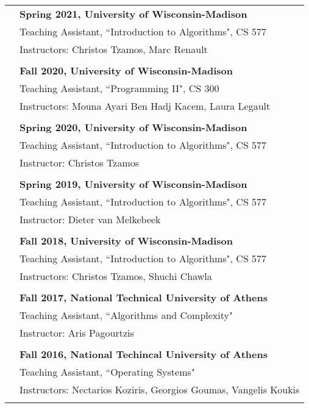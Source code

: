 \documentclass[letterpaper,11pt,oneside]{article}
\begin{document}
\begin{longtable}{@{} l l}
  & \textbf{Spring 2021, University of Wisconsin-Madison} \\
  & Teaching Assistant, ``Introduction to Algorithms", CS 577 \\
  & Instructors: Christos Tzamos, Marc Renault \\
  & \\

  & \textbf{Fall 2020, University of Wisconsin-Madison} \\
  & Teaching Assistant, ``Programming II", CS 300 \\
  & Instructors: Mouna Ayari Ben Hadj Kacem, Laura Legault \\
  & \\

  & \textbf{Spring 2020, University of Wisconsin-Madison} \\
  & Teaching Assistant, ``Introduction to Algorithms", CS 577 \\
  & Instructor: Christos Tzamos \\
  & \\

     & \textbf{Spring 2019, University of Wisconsin-Madison} \\
     & Teaching Assistant, ``Introduction to Algorithms", CS 577 \\
     & Instructor: Dieter van Melkebeek \\
     & \\

     &\textbf{Fall 2018, University of Wisconsin-Madison} \\
     & Teaching Assistant, ``Introduction to Algorithms", CS 577 \\
     & Instructors: Christos Tzamos, Shuchi Chawla \\
     & \\

     &\textbf{Fall 2017, National Technical University of Athens} \\
     & Teaching Assistant, ``Algorithms and Complexity" \\
     & Instructor: Aris Pagourtzis \\
     & \\

     &\textbf{Fall 2016, National Techincal University of Athens} \\
     & Teaching Assistant, ``Operating Systems" \\
     & Instructors: Nectarios Koziris, Georgios Goumas, Vangelis Koukis\\
     & \\


\end{longtable}
\end{document}
